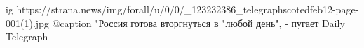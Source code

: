  
 
 
 
 

\ifcmt
  ig https://strana.news/img/forall/u/0/0/_123232386_telegraphscotedfeb12-page-001(1).jpg
	@caption "Россия готова вторгнуться в "любой день", - пугает Daily Telegraph 
\fi
